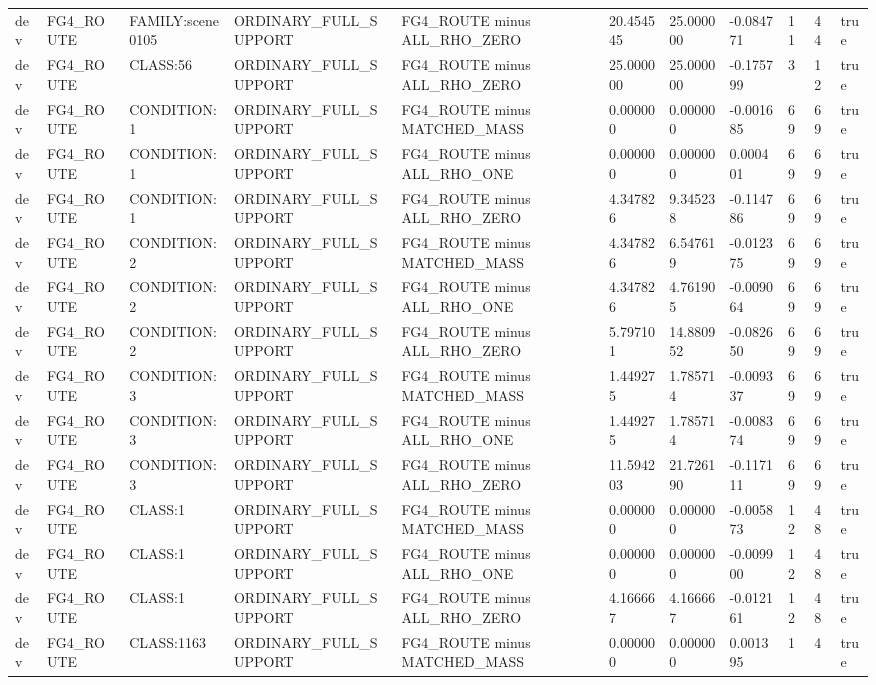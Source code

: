 \begin{tabular}{lllllllllll}
dev & FG4\_ROUTE & FAMILY:scene0105 & ORDINARY\_FULL\_SUPPORT & FG4\_ROUTE minus ALL\_RHO\_ZERO & 20.454545 & 25.000000 & -0.084771 & 11 & 44 & true \\
dev & FG4\_ROUTE & CLASS:56 & ORDINARY\_FULL\_SUPPORT & FG4\_ROUTE minus ALL\_RHO\_ZERO & 25.000000 & 25.000000 & -0.175799 & 3 & 12 & true \\
dev & FG4\_ROUTE & CONDITION:1 & ORDINARY\_FULL\_SUPPORT & FG4\_ROUTE minus MATCHED\_MASS & 0.000000 & 0.000000 & -0.001685 & 69 & 69 & true \\
dev & FG4\_ROUTE & CONDITION:1 & ORDINARY\_FULL\_SUPPORT & FG4\_ROUTE minus ALL\_RHO\_ONE & 0.000000 & 0.000000 & 0.000401 & 69 & 69 & true \\
dev & FG4\_ROUTE & CONDITION:1 & ORDINARY\_FULL\_SUPPORT & FG4\_ROUTE minus ALL\_RHO\_ZERO & 4.347826 & 9.345238 & -0.114786 & 69 & 69 & true \\
dev & FG4\_ROUTE & CONDITION:2 & ORDINARY\_FULL\_SUPPORT & FG4\_ROUTE minus MATCHED\_MASS & 4.347826 & 6.547619 & -0.012375 & 69 & 69 & true \\
dev & FG4\_ROUTE & CONDITION:2 & ORDINARY\_FULL\_SUPPORT & FG4\_ROUTE minus ALL\_RHO\_ONE & 4.347826 & 4.761905 & -0.009064 & 69 & 69 & true \\
dev & FG4\_ROUTE & CONDITION:2 & ORDINARY\_FULL\_SUPPORT & FG4\_ROUTE minus ALL\_RHO\_ZERO & 5.797101 & 14.880952 & -0.082650 & 69 & 69 & true \\
dev & FG4\_ROUTE & CONDITION:3 & ORDINARY\_FULL\_SUPPORT & FG4\_ROUTE minus MATCHED\_MASS & 1.449275 & 1.785714 & -0.009337 & 69 & 69 & true \\
dev & FG4\_ROUTE & CONDITION:3 & ORDINARY\_FULL\_SUPPORT & FG4\_ROUTE minus ALL\_RHO\_ONE & 1.449275 & 1.785714 & -0.008374 & 69 & 69 & true \\
dev & FG4\_ROUTE & CONDITION:3 & ORDINARY\_FULL\_SUPPORT & FG4\_ROUTE minus ALL\_RHO\_ZERO & 11.594203 & 21.726190 & -0.117111 & 69 & 69 & true \\
dev & FG4\_ROUTE & CLASS:1 & ORDINARY\_FULL\_SUPPORT & FG4\_ROUTE minus MATCHED\_MASS & 0.000000 & 0.000000 & -0.005873 & 12 & 48 & true \\
dev & FG4\_ROUTE & CLASS:1 & ORDINARY\_FULL\_SUPPORT & FG4\_ROUTE minus ALL\_RHO\_ONE & 0.000000 & 0.000000 & -0.009900 & 12 & 48 & true \\
dev & FG4\_ROUTE & CLASS:1 & ORDINARY\_FULL\_SUPPORT & FG4\_ROUTE minus ALL\_RHO\_ZERO & 4.166667 & 4.166667 & -0.012161 & 12 & 48 & true \\
dev & FG4\_ROUTE & CLASS:1163 & ORDINARY\_FULL\_SUPPORT & FG4\_ROUTE minus MATCHED\_MASS & 0.000000 & 0.000000 & 0.001395 & 1 & 4 & true \\

\end{tabular}
